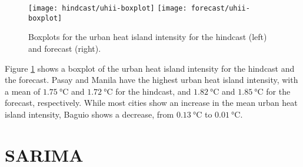 
	\begin{figure}	
		\centering
		\texttt{[image: hindcast/uhii-boxplot]}		
		\texttt{[image: forecast/uhii-boxplot]}		
		\caption{
			Boxplots for the urban heat island intensity for the hindcast (left) and forecast (right).
		}
		\label{fig:uhii-boxplot}
	\end{figure}	

	Figure \ref{fig:uhii-boxplot} shows a boxplot of the urban heat island intensity for the hindcast and the forecast.
	Pasay and Manila have the highest urban heat island intensity, with a mean of 
		$\qty{1.75}{\degreeCelsius}$ and $\qty{1.72}{\degreeCelsius}$ for the hindcast,
		and
		$\qty{1.82}{\degreeCelsius}$ and $\qty{1.85}{\degreeCelsius}$ for the forecast, respectively.
	While most cities show an increase in the mean urban heat island intensity, Baguio shows a decrease, from $\qty{0.13}{\degreeCelsius}$ to $\qty{0.01}{\degreeCelsius}$.

\section{SARIMA}

